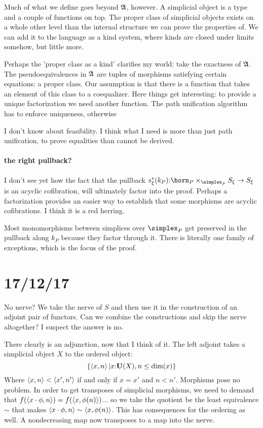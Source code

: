 \documentclass[csh.tex]{subfiles}
\begin{document}
Much of what we define goes beyond $\mathfrak A$, however. A simplicial object is a type and a couple of functions on top. The proper class of simplicial objects exists on a whole other level than the internal structure we can prove the properties of.
We can add it to the language as a kind system, where kinds are closed under limits somehow, but little more.

Perhaps the 'proper class as a kind' clarifies my world: take the exactness of $\mathfrak A$. The pseudoequivalences in $\mathfrak A$ are tuples of morphisms satisfying certain equations: a proper class. Our assumption is that there is a function that takes an element of this class to a coequalizer.
Here things get interesting: to provide a unique factorization we need another function. The path unification algorithm has to enforce uniqueness, otherwise 

I don't know about feasibility. I think what I need is more than just path unification, to prove equalities than cannot be derived.

\paragraph{the right pullback?}
I don't see yet how the fact that the pullback $s_\xi\ri(k_P)\of \horn_P\times_{\simplex_P}S_\xi \to S_\xi$ is an acyclic cofibration, will ultimately factor into the proof. Perhaps a factorization provides an easier way to establish that some morphisms are acyclic cofibrations.
I think it is a red herring.

Most monomorphisms between simplices over $\simplex_P$ get preserved in the pullback along $k_P$ because they factor through it. There is literally one family of exceptions, which is the focus of the proof.

\section{17/12/17}
No nerve? We take the nerve of $S$ and then use it in the construction of an adjoint pair of functors. Can we combine the constructions and skip the nerve altogether? I suspect the answer is no.

There clearly is an adjunction, now that I think of it. The left adjoint takes a simplicial object $X$ to the ordered object:
\[ \left\{\left\langle x,n \right\rangle|x\mathord :\mathbf{U}(X),n\leq \dim(x)\right\} \]
Where $\left\langle x,n \right\rangle<\left\langle x',n' \right\rangle$ if and only if $x=x'$ and $n<n'$. Morphisms pose no problem.
In order to get transposes of simplicial morphisms, we need to demand that $f(\left\langle x\cdot\phi,n \right\rangle) = f(\left\langle x,\phi(n) \right\rangle)$... so we take the quotient be the least equivalence $\sim$ that makes $\left\langle x\cdot\phi,n \right\rangle\sim \left\langle x,\phi(n) \right\rangle$. This has consequences for the ordering as well. A nondecreasing map now transposes to a map into the nerve.
\end{document}
